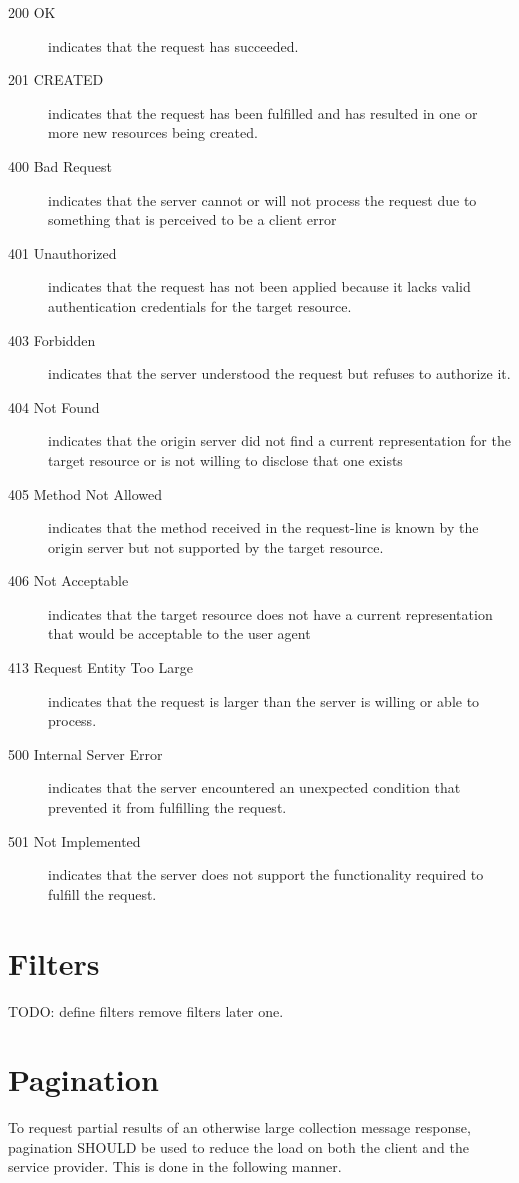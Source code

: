 \documentclass[10pt,a4paper]{article}
\begin{document}
\begin{description}
\item[200 OK] indicates that the request has succeeded.
\item[201 CREATED] indicates that the request has been fulfilled and has resulted in one or more new resources being created.
\item[400 Bad Request] indicates that the server cannot or will not process the request due to something that is perceived to be a client error
\item[401 Unauthorized] indicates that the request has not been applied because it lacks valid authentication credentials for the target resource.
\item[403 Forbidden] indicates that the server understood the request but refuses to authorize it.
\item[404 Not Found] indicates that the origin server did not find a current representation for the target resource or is not willing to disclose that one exists
\item[405 Method Not Allowed] indicates that the method received in the request-line is known by the origin server but not supported by the target resource.
\item[406 Not Acceptable] indicates that the target resource does not have a current representation that would be acceptable to the user agent
\item[413 Request Entity Too Large] indicates that the request is larger than the server is willing or able to process.
\item[500 Internal Server Error] indicates that the server encountered an unexpected condition that prevented it from fulfilling the request.
\item[501 Not Implemented] indicates that the server does not support the functionality required to fulfill the request.
\end{description}

\section{Filters}

TODO: define filters
remove filters later one.

\section{Pagination}

To request partial results of an otherwise large collection message response, pagination SHOULD be used to reduce the load on 
both the client and the service provider. This is done in the following manner.
\end{document}
